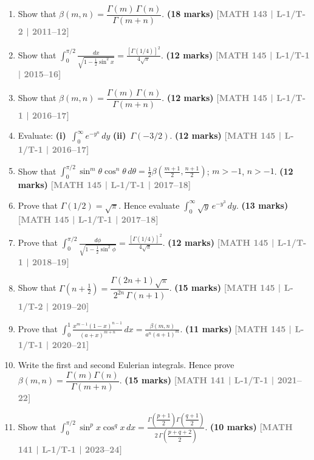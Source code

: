 \documentclass[12pt,a4paper]{article}
\newcommand{\yr}[1]{\hfill\textcolor{gray}{\small\textbf{[#1]}}}
\newcommand{\mk}[1]{\textcolor{orange!70!black}{\small\textbf{(#1 marks)}}}
\begin{document}
\begin{enumerate}

\item Show that $\beta(m,n)=\dfrac{\Gamma(m)\,\Gamma(n)}{\Gamma(m+n)}$.
\mk{18} \yr{MATH 143 | L-1/T-2 | 2011--12}

\item Show that $\displaystyle\int_{0}^{\pi/2}\frac{dx}{\sqrt{1-\tfrac{1}{2}\sin^{2}x}}=\frac{[\Gamma(1/4)]^{2}}{4\sqrt{\pi}}$.
\mk{12} \yr{MATH 145 | L-1/T-1 | 2015--16}

\item Show that $\beta(m,n)=\dfrac{\Gamma(m)\,\Gamma(n)}{\Gamma(m+n)}$.
\mk{12} \yr{MATH 145 | L-1/T-1 | 2016--17}

\item Evaluate: \textbf{(i)}~$\displaystyle\int_{0}^{\infty}e^{-y^{n}}\,dy$ \quad \textbf{(ii)}~$\Gamma(-3/2)$.
\mk{12} \yr{MATH 145 | L-1/T-1 | 2016--17}

\item Show that $\displaystyle\int_{0}^{\pi/2}\sin^{m}\theta\cos^{n}\theta\,d\theta=\tfrac{1}{2}\beta\!\left(\tfrac{m+1}{2},\tfrac{n+1}{2}\right)$; $m>-1$, $n>-1$.
\mk{12} \yr{MATH 145 | L-1/T-1 | 2017--18}

\item Prove that $\Gamma(1/2)=\sqrt{\pi}$. Hence evaluate $\displaystyle\int_{0}^{\infty}\sqrt{y}\,e^{-y^{3}}\,dy$.
\mk{13} \yr{MATH 145 | L-1/T-1 | 2017--18}

\item Prove that $\displaystyle\int_{0}^{\pi/2}\frac{d\phi}{\sqrt{1-\tfrac{1}{2}\sin^{2}\phi}}=\frac{[\Gamma(1/4)]^{2}}{4\sqrt{\pi}}$.
\mk{12} \yr{MATH 145 | L-1/T-1 | 2018--19}

\item Show that $\Gamma\!\left(n+\tfrac{1}{2}\right)=\dfrac{\Gamma(2n+1)\sqrt{\pi}}{2^{2n}\,\Gamma(n+1)}$.
\mk{15} \yr{MATH 145 | L-1/T-2 | 2019--20}

\item Prove that $\displaystyle\int_{0}^{1}\frac{x^{m-1}(1-x)^{n-1}}{(a+x)^{m+n}}\,dx=\frac{\beta(m,n)}{a^{n}(a+1)^{m}}$.
\mk{11} \yr{MATH 145 | L-1/T-1 | 2020--21}

\item Write the first and second Eulerian integrals. Hence prove $\beta(m,n)=\dfrac{\Gamma(m)\Gamma(n)}{\Gamma(m+n)}$.
\mk{15} \yr{MATH 141 | L-1/T-1 | 2021--22}

\item Show that $\displaystyle\int_{0}^{\pi/2}\sin^{p}x\cos^{q}x\,dx=\frac{\Gamma\!\left(\dfrac{p+1}{2}\right)\Gamma\!\left(\dfrac{q+1}{2}\right)}{2\,\Gamma\!\left(\dfrac{p+q+2}{2}\right)}$.
\mk{10} \yr{MATH 141 | L-1/T-1 | 2023--24}

\end{enumerate}
\end{document}
